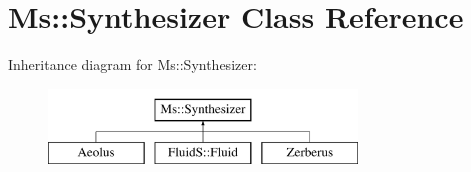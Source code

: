 \hypertarget{class_ms_1_1_synthesizer}{}\section{Ms\+:\+:Synthesizer Class Reference}
\label{class_ms_1_1_synthesizer}
Inheritance diagram for Ms\+:\+:Synthesizer\+:\begin{figure}[H]
\begin{center}
\leavevmode
\includegraphics[height=2.000000cm]{class_ms_1_1_synthesizer}
\end{center}
\end{figure}
